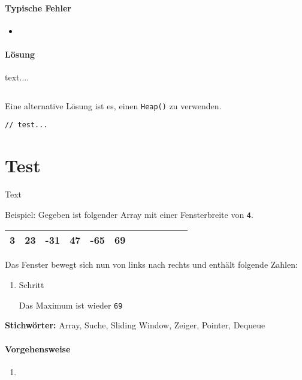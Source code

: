 \documentclass[babel]{book}
\begin{document}
\paragraph{Typische Fehler}
\begin{itemize} 
	\item 
\end{itemize}

\paragraph{Lösung}
text....

\begin{lstlisting}[caption=My Javascript Example]

\end{lstlisting}

Eine alternative Lösung ist es, einen \lstinline|Heap()| zu verwenden.
\begin{lstlisting}[caption=My Javascript Example]
// test...

\end{lstlisting}


\section{Test}
\begin{examplei}
	Text
	
	Beispiel:
	Gegeben ist folgender Array mit einer Fensterbreite von \lstinline|4|. 	
	
	\begin{tabular}{|l|l|l|l|l|l|l|l|l|l|l|l|} 
		\hline
		3 & 23 & -31 & 47 & -65 & 69 \\
		\hline
	\end{tabular}
	Das Fenster bewegt sich nun von links nach rechts und enthält folgende Zahlen:
	\begin{enumerate}
		\item Schritt	

		Das Maximum ist wieder \lstinline|69|
	\end{enumerate}
		
\end{examplei}
{\bf Stichwörter:} Array, Suche, Sliding Window, Zeiger, Pointer, Dequeue

\paragraph{Vorgehensweise}
\begin{enumerate} 
	\item 
\end{enumerate}
\end{document}

